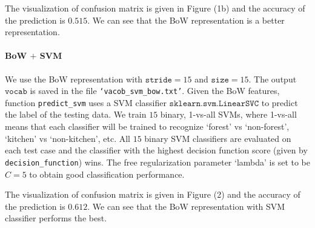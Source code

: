 \documentclass[11pt]{scrartcl}
\begin{document}
The visualization of confusion matrix is given in Figure (1b) and the accuracy of the prediction is  $0.515$. We can see that the BoW representation is a better representation. 

\paragraph{\textbf{BoW $+$ SVM}}
We use the BoW representation with $\texttt{stride}=15$ and $\texttt{size}=15$. The output $\texttt{vocab}$ is saved in the file \texttt{`vacob\_svm\_bow.txt'}. Given the BoW features, function \texttt{predict\_svm} uses a SVM classifier $\texttt{sklearn.svm.LinearSVC}$ to predict the label of the testing data. We train $15$ binary, 1-vs-all SVMs, where 1-vs-all means that each classifier will be trained to recognize `forest' vs `non-forest', `kitchen' vs `non-kitchen', etc. All $15$  binary SVM classifiers  are evaluated on each test  case and the classifier with the highest decision function score (given by \texttt{decision\_function}) wins. The free regularization parameter `lambda' is set to be $C=5$ to obtain good classification performance.

The visualization of confusion matrix is given in Figure (2) and the accuracy of the prediction is  $0.612$. We can see that the BoW representation with SVM classifier performs the best.


\begin{figure}[H]
	\captionsetup[subfigure]{labelformat=empty}
	\centering
	\label{fig:confusion2}
\end{figure}













\nocite*{}  


\end{document}
